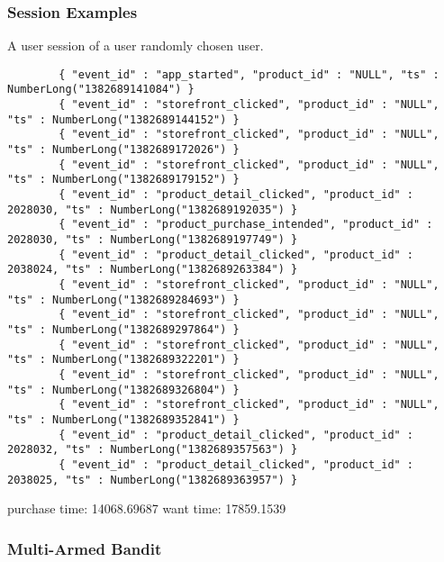 
\subsubsection{Session Examples} %
    \label{par:session_examples}
    A user session of a user randomly chosen user.
    \begin{lstlisting}
        { "event_id" : "app_started", "product_id" : "NULL", "ts" : NumberLong("1382689141084") }
        { "event_id" : "storefront_clicked", "product_id" : "NULL", "ts" : NumberLong("1382689144152") }
        { "event_id" : "storefront_clicked", "product_id" : "NULL", "ts" : NumberLong("1382689172026") }
        { "event_id" : "storefront_clicked", "product_id" : "NULL", "ts" : NumberLong("1382689179152") }
        { "event_id" : "product_detail_clicked", "product_id" : 2028030, "ts" : NumberLong("1382689192035") }
        { "event_id" : "product_purchase_intended", "product_id" : 2028030, "ts" : NumberLong("1382689197749") }
        { "event_id" : "product_detail_clicked", "product_id" : 2038024, "ts" : NumberLong("1382689263384") }
        { "event_id" : "storefront_clicked", "product_id" : "NULL", "ts" : NumberLong("1382689284693") }
        { "event_id" : "storefront_clicked", "product_id" : "NULL", "ts" : NumberLong("1382689297864") }
        { "event_id" : "storefront_clicked", "product_id" : "NULL", "ts" : NumberLong("1382689322201") }
        { "event_id" : "storefront_clicked", "product_id" : "NULL", "ts" : NumberLong("1382689326804") }
        { "event_id" : "storefront_clicked", "product_id" : "NULL", "ts" : NumberLong("1382689352841") }
        { "event_id" : "product_detail_clicked", "product_id" : 2028032, "ts" : NumberLong("1382689357563") }
        { "event_id" : "product_detail_clicked", "product_id" : 2038025, "ts" : NumberLong("1382689363957") }
    \end{lstlisting}

    purchase time: 14068.69687
    want time: 17859.1539



\subsubsection{Multi-Armed Bandit} %
    \label{par:multi_armed_bandit}

